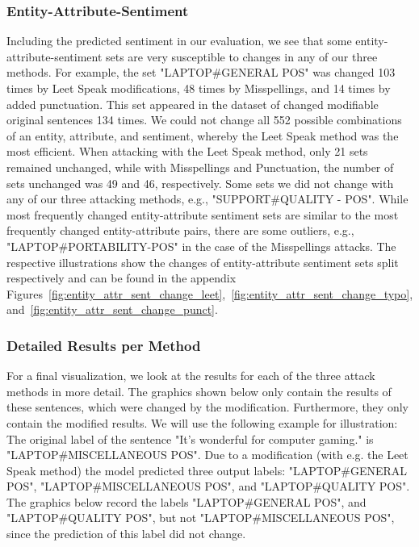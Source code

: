 \subsubsection{Entity-Attribute-Sentiment}
Including the predicted sentiment in our evaluation, we see that some entity-attribute-sentiment sets are very susceptible to changes in any of our three methods. For example, the set "LAPTOP\#GENERAL POS" was changed 103 times by Leet Speak modifications, 48 times by Misspellings, and 14 times by added punctuation. This set appeared in the dataset of changed modifiable original sentences 134 times. We could not change all 552 possible combinations of an entity, attribute, and sentiment, whereby the Leet Speak method was the most efficient. When attacking with the Leet Speak method, only 21 sets remained unchanged, while with Misspellings and Punctuation, the number of sets unchanged was 49 and 46, respectively. Some sets we did not change with any of our three attacking methods, e.g., "SUPPORT\#QUALITY - POS". While most frequently changed entity-attribute sentiment sets are similar to the most frequently changed entity-attribute pairs, there are some outliers, e.g., "LAPTOP\#PORTABILITY-POS" in the case of the Misspellings attacks. The respective illustrations show the changes of entity-attribute sentiment sets split respectively and can be found in the appendix Figures~\ref{fig:entity_attr_sent_change_leet},~\ref{fig:entity_attr_sent_change_typo}, and~\ref{fig:entity_attr_sent_change_punct}.

\subsubsection{Detailed Results per Method}

For a final visualization, we look at the results for each of the three attack methods in more detail.
The graphics shown below only contain the results of these sentences, which were changed by the modification. Furthermore, they only contain the modified results. We will use the following example for illustration:
The original label of the sentence "It's wonderful for computer gaming." is "LAPTOP\#MISCELLANEOUS POS". Due to a modification (with e.g. the Leet Speak method) the model predicted three output labels: "LAPTOP\#GENERAL POS", "LAPTOP\#MISCELLANEOUS POS", and "LAPTOP\#QUALITY POS". The graphics below record the labels "LAPTOP\#GENERAL POS", and "LAPTOP\#QUALITY POS", but not "LAPTOP\#MISCELLANEOUS POS", since the prediction of this label did not change. 


